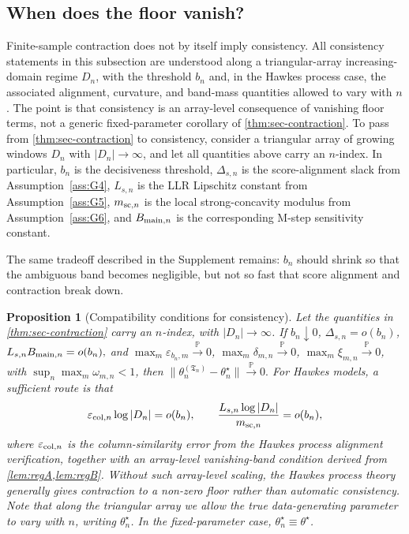 \documentclass{statsoc}
\newtheorem{proposition}[proposition]{Proposition}
\newcommand{\1}{\mathbbm{1}}
\newcommand{\Tmax}{\mathfrak{T}}
\begin{document}
\subsection{When does the floor vanish?}\label{subsec:regimes}

Finite-sample contraction does not by itself imply consistency.  All consistency statements in this subsection are understood along a triangular-array increasing-domain regime \(D_n\), with the threshold \(b_n\) and, in the Hawkes process case, the associated alignment, curvature, and band-mass quantities allowed to vary with \(n\). The point is that consistency is an array-level consequence of vanishing floor terms, not a generic fixed-parameter corollary of \cref{thm:sec-contraction}. To pass from \cref{thm:sec-contraction} to consistency, consider a triangular array of growing windows \(D_n\) with \(|D_n|\to\infty\), and let all quantities above carry an \(n\)-index. In particular, \(b_n\) is the decisiveness threshold, \(\Delta_{s,n}\) is the score-alignment slack from Assumption~\ref{ass:G4}, \(L_{s,n}\) is the LLR Lipschitz constant from Assumption~\ref{ass:G5}, \(m_{{\rm sc},n}\) is the local strong-concavity modulus from Assumption~\ref{ass:G6}, and \(B_{{\rm main},n}\) is the corresponding M-step sensitivity constant.

The same tradeoff described in the Supplement remains: \(b_n\) should shrink so that the ambiguous band becomes negligible, but not so fast that score alignment and contraction break down.

\begin{proposition}[Compatibility conditions for consistency]\label{prop:compatibility}
Let the quantities in \cref{thm:sec-contraction} carry an \(n\)-index, with \(|D_n|\to\infty\). If
\(
b_n\downarrow 0\), \(
\Delta_{s,n}=o(b_n)\), \(
L_{s,n}B_{{\rm main},n}=o(b_n),
\)
and
\(
\max_m \varepsilon_{b_n,m}\xrightarrow{\mathbb P}0\), \(
\max_m \delta_{m,n}\xrightarrow{\mathbb P}0\), \(
\max_m \xi_{m,n}\xrightarrow{\mathbb P}0\),
with \(\sup_n\max_m \omega_{m,n}<1\), then
\(
\|\theta_n^{(\Tmax_n)}-\theta_n^\star\|\xrightarrow{\mathbb P} 0.
\)
For Hawkes models, a sufficient route is that
\[
\varepsilon_{{\rm col},n}\log |D_n|=o(b_n),
\qquad
\frac{L_{s,n}\log|D_n|}{m_{{\rm sc},n}}=o(b_n),
\]
where \(\varepsilon_{{\rm col},n}\) is the column-similarity error from the Hawkes process alignment verification, together with an array-level vanishing-band condition derived from \cref{lem:regA,lem:regB}. Without such array-level scaling, the Hawkes process theory generally gives contraction to a non-zero floor rather than automatic consistency. Note that along the triangular array we allow the true data-generating parameter to vary with \(n\), writing \(\theta_n^\star\). In the fixed-parameter case, \(\theta_n^\star\equiv\theta^\star\).
\end{proposition}
\end{document}
